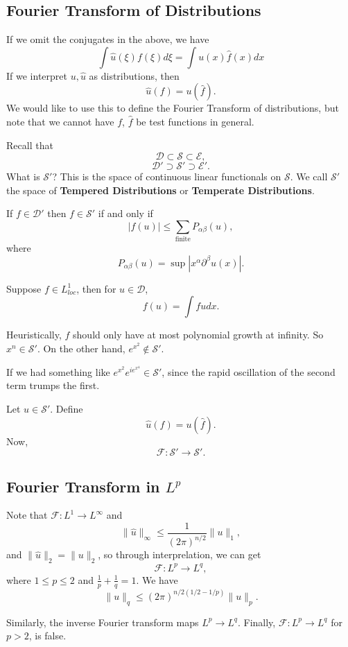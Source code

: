 \documentclass[12pt]{scrartcl}
\renewcommand{\hat}{\widehat}
\begin{document}
\subsection{Fourier Transform of Distributions}
If we omit the conjugates in the above, we have 
$$\int \hat{u}(\xi)f(\xi)d\xi = \int u(x)\hat{f}(x)dx$$
If we interpret $u, \hat{u}$ as distributions, then 
$$\hat{u}(f) = u(\hat{f}).$$
We would like to use this to define the Fourier Transform of distributions, but note that we cannot have $f$, $\hat{f}$ be test functions in general.  

Recall that 
$$\mathcal D \subset \mathcal S \subset \mathcal E,$$
$$\mathcal D' \supset \mathcal S' \supset \mathcal E'.$$
What is $\mathcal S'$?  This is the space of continuous linear functionals on $\mathcal S$.  We call $\mathcal S'$ the space of \textbf{Tempered Distributions} or \textbf{Temperate Distributions}.

If $f \in \mathcal D'$ then $f \in \mathcal S'$ if and only if 
$$|f(u)| \le \sum_{\text{finite}} P_{\alpha \beta}(u),$$
where $$P_{\alpha \beta}(u) = \sup|x^{\alpha}\partial^\beta u(x)|.$$

Suppose $f \in L_{loc}^1$, then for $u \in \mathcal D$,
$$f(u) = \int fu dx.$$

\begin{example}
Heuristically, $f$ should only have at most polynomial growth at infinity.  So $x^n \in \mathcal S'$.  On the other hand, $e^{x^2} \not \in \mathcal S'$.  

If we had something like $e^{x^2}e^{ie^{x^4}} \in \mathcal S'$, since the rapid oscillation of the second term trumps the first.
\end{example}
\begin{definition}Let $u \in \mathcal S'$.  Define 
$$\hat{u}(f) = u(\hat{f}).$$
Now,
$$\mathcal F: \mathcal S' \to \mathcal S'.$$
\end{definition}
\subsection{Fourier Transform in $L^p$}
Note that $\mathcal F: L^1 \rightarrow L^{\infty}$ and $$\|\hat{u}\|_{\infty} \le \frac{1}{(2\pi)^{n/2}}\|u\|_1,$$
and $\| \hat{u}\|_2 = \|u\|_2$, so through interprelation, we can get 
$$\mathcal F : L^p \to L^{q},$$
where $1 \le p \le 2$ and $\frac{1}{p} + \frac{1}{q} = 1$.  We have 
$$\|u\|_{q} \le (2\pi)^{n/2(1/2 - 1/p)}\|u\|_p.$$

Similarly, the inverse Fourier transform maps $L^p \to L^q$.  Finally, $\mathcal F: L^p \to L^q$ for $p > 2$, is false. 
\end{document}
